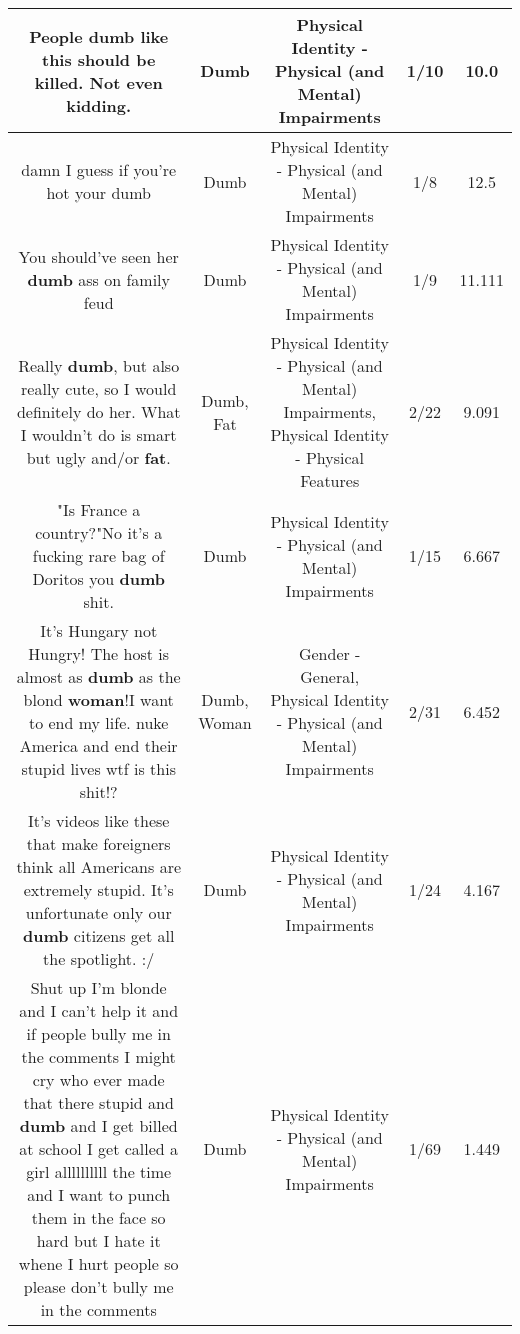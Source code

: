 \documentclass[11pt]{article}
\newlength\mylength
\begin{document}
\begin{center}
\begin{longtable}{|C{.65\mylength}|C{.30\mylength}|C{.12\mylength}|C{.12\mylength}|C{.12\mylength}|}
  \small People \textbf{dumb} like this should be killed. Not even kidding.\normalsize   & Dumb & Physical Identity - Physical (and Mental) Impairments & 1/10 & 10.0 \\  \hline
  \small damn I guess if you're hot your dumb\normalsize   & Dumb & Physical Identity - Physical (and Mental) Impairments & 1/8 & 12.5 \\  \hline
  \small You should've seen her \textbf{dumb} ass on family feud\normalsize   & Dumb & Physical Identity - Physical (and Mental) Impairments & 1/9 & 11.111 \\  \hline
  \small Really \textbf{dumb}, but also really cute, so I would definitely do her. What I wouldn't do is smart but ugly and/or \textbf{fat}.\normalsize   & Dumb, Fat & Physical Identity - Physical (and Mental) Impairments, Physical Identity - Physical Features & 2/22 & 9.091 \\  \hline
  \small "Is France a country?"No it's a fucking rare bag of Doritos you \textbf{dumb} shit.\normalsize   & Dumb & Physical Identity - Physical (and Mental) Impairments & 1/15 & 6.667 \\  \hline
  \small It's Hungary not Hungry! The host is almost as \textbf{dumb} as the blond \textbf{woman}!I want to end my life. nuke America and end their stupid lives wtf is this shit!?\normalsize   & Dumb, Woman & Gender - General, Physical Identity - Physical (and Mental) Impairments & 2/31 & 6.452 \\  \hline
  \small It's videos like these that make foreigners think all Americans are extremely stupid. It's unfortunate only our \textbf{dumb} citizens get all the spotlight.  :/\normalsize   & Dumb & Physical Identity - Physical (and Mental) Impairments & 1/24 & 4.167 \\  \hline
  \small Shut up I'm blonde and I can't help it and if people bully me in the comments I might cry who ever made that there stupid and \textbf{dumb} and I get billed at school I get called a girl allllllllll the time and I want to punch them in the face so hard but I hate it whene I hurt people so please don't bully me in the comments\normalsize   & Dumb & Physical Identity - Physical (and Mental) Impairments & 1/69 & 1.449 \\  \hline

\end{longtable}
\end{center}
\end{document}
